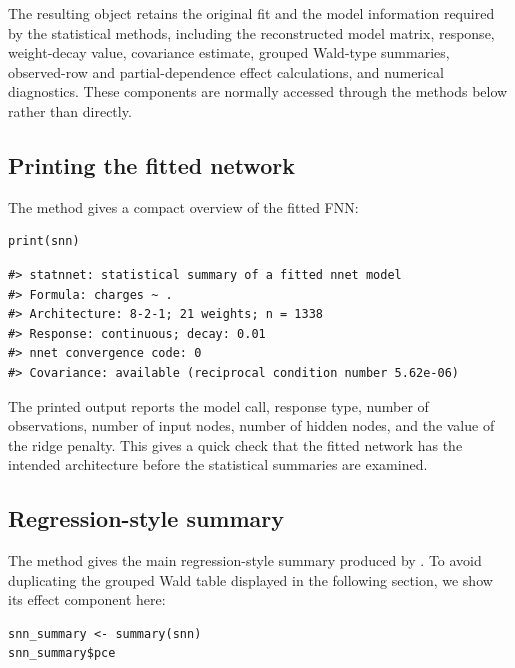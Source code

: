 The resulting object retains the original  fit and the model information required by the statistical methods, including the reconstructed model matrix, response, weight-decay value, covariance estimate, grouped Wald-type summaries, observed-row and partial-dependence effect calculations, and numerical diagnostics.
These components are normally accessed through the methods below rather than directly.

\subsection{Printing the fitted network}\label{printing-the-fitted-network}

The  method gives a compact overview of the fitted FNN:

\begin{verbatim}
print(snn)
\end{verbatim}

\begin{verbatim}
#> statnnet: statistical summary of a fitted nnet model
#> Formula: charges ~ .
#> Architecture: 8-2-1; 21 weights; n = 1338
#> Response: continuous; decay: 0.01
#> nnet convergence code: 0
#> Covariance: available (reciprocal condition number 5.62e-06)
\end{verbatim}

The printed output reports the model call, response type, number of observations, number of input nodes, number of hidden nodes, and the value of the ridge penalty.
This gives a quick check that the fitted network has the intended architecture before the statistical summaries are examined.

\subsection{Regression-style summary}\label{regression-style-summary}

The  method gives the main regression-style summary produced by .
To avoid duplicating the grouped Wald table displayed in the following section, we show its effect component here:

\begin{verbatim}
snn_summary <- summary(snn)
snn_summary$pce
\end{verbatim}

